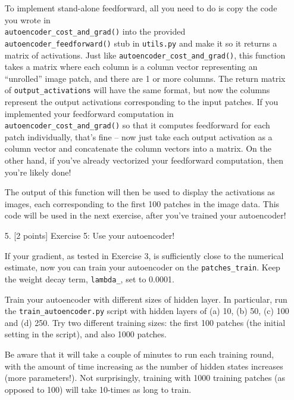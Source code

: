 \documentclass[10pt]{article}
\begin{document}
\begin{itemize}
To implement stand-alone feedforward, all you need to do is copy the code you wrote in\\ {\tt autoencoder\_cost\_and\_grad()} into the provided {\tt autoencoder\_feedforward()} stub in {\tt utils.py} and make it so it returns a matrix of activations.  Just like {\tt autoencoder\_cost\_and\_grad()}, this function takes a matrix where each column is a column vector representing an ``unrolled'' image patch, and there are 1 or more columns.  The return matrix of {\tt output\_activations} will have the same format, but now the columns represent the output activations corresponding to the input patches.  If you implemented your feedforward computation in {\tt autoencoder\_cost\_and\_grad()} so that it computes feedforward for each patch individually, that's fine -- now just take each output activation as a column vector and concatenate the column vectors into a matrix.  On the other hand, if you've already vectorized your feedforward computation, then you're likely done!

The output of this function will then be used to display the activations as images, each corresponding to the first 100 patches in the image data.  This code will be used in the next exercise, after you've trained your autoencoder!



\item[5.] [2 points]
Exercise 5:  Use your autoencoder!

If your gradient, as tested in Exercise 3, is sufficiently close to the numerical estimate, now you can train your autoencoder on the {\tt patches\_train}.  
Keep the weight decay term, {\tt lambda\_}, set to 0.0001.

Train your autoencoder with different sizes of hidden layer.  In particular, run the {\tt train\_autoencoder.py} script with hidden layers of (a) 10, (b) 50, (c) 100 and (d) 250.
Try two different training sizes: the first 100 patches (the initial setting in the script), and also 1000 patches.

Be aware that it will take a couple of minutes to run each training round, with the amount of time increasing as the number of hidden states increases (more parameters!).  Not surprisingly, training with 1000 training patches (as opposed to 100) will take 10-times as long to train.


\end{itemize}
\end{document}
